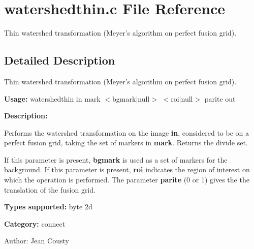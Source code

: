 \section{watershedthin.c File Reference}
\label{watershedthin_8c}
Thin watershed transformation (Meyer's algorithm on perfect fusion grid).  




\label{_details}
\subsection{Detailed Description}
Thin watershed transformation (Meyer's algorithm on perfect fusion grid). 

{\bf Usage:} watershedthin in mark $<$bgmark$|$null$>$ $<$roi$|$null$>$ parite out

{\bf Description:}

Performs the watershed transformation on the image {\bf in}, considered to be on a perfect fusion grid, taking the set of markers in {\bf mark}. Returns the divide set.

If this parameter is present, {\bf bgmark} is used as a set of markers for the background. If this parameter is present, {\bf roi} indicates the region of interest on which the operation is performed. The parameter {\bf parite} (0 or 1) gives the the translation of the fusion grid.

{\bf Types supported:} byte 2d

{\bf Category:} connect

\begin{Desc}
\item[Author:]Jean Cousty \end{Desc}
